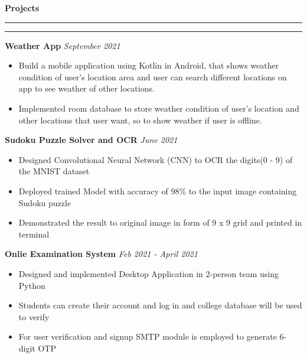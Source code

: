 \documentclass[11pt]{article}
\begin{document}
    \textbf{\large{Projects}}
    	\vspace{5pt}
    	\hrule \hrule
    	\vspace{4pt}
    	\hspace{8pt}
    	\textbf{Weather App}
    	\href{https://github.com/Abhay811/Weather-App}{\color{blue}}
    	\hfill
        \textit{September 2021}
        \vspace{-6pt}
        \begin{itemize}
        	\setlength{\itemsep}{0pt}
        	\setlength{\parskip}{0pt}
        	\setlength{\parsep}{0pt}
        	\item Build a mobile application using Kotlin in Android, that shows weather condition of user's location area and user can search different locations on app to see weather of other locations.
        	\item Implemented room database to store weather condition of user's location and other locations that user want, so to show weather if user is offline.
        \end{itemize}
    	\hspace{8pt}
    	\textbf{Sudoku Puzzle Solver and OCR}
    	\href{https://github.com/Abhay811/Sudoku_solver}{\color{blue}}
    	\hfill
    	\textit{June 2021}
    	\vspace{-6pt}
       	\begin{itemize}
        	\setlength\itemsep{0pt}
        	\setlength\parskip{0pt}
        	\setlength\parsep{0pt}
        	\item  Designed Convolutional Neural Network (CNN) to OCR the digits(0 - 9) of the MNIST dataset
        	\item Deployed trained Model with accuracy of 98\% to the input image containing Sudoku puzzle
        	\item Demonstrated the result to original image in form of 9 x 9 grid and printed in terminal
        \end{itemize}
    	\hspace{8pt}
    	\textbf{Onlie Examination System}
    	\href{https://github.com/Abhay811/Advanced-Online-Examination}{\color{blue}}
    	\hfill
    	\textit{Feb 2021 - April 2021}
    	\vspace{-6pt}
    	\begin{itemize}
        	\setlength{\itemsep}{0pt}
        	\setlength{\parskip}{0pt}
        	\setlength{\parsep}{0pt}
        	\item Designed and implemented Desktop Application in 2-person team using Python
        	\item Students can create their account and log in and college database will be used to verify
        	\item For user verification and signup SMTP module is employed to generate 6-digit OTP
    	\end{itemize}
\end{document}
